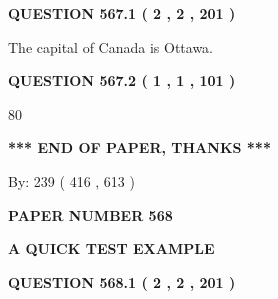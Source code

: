 \documentclass[12pt]{article}
\begin{document}
{\textbf{\Large{QUESTION
567.1 
 ( 2 , 2 , 201 )
}}}
  
  
 
 
\noindent{}
 
 
The capital of Canada is Ottawa.
 
 
 
 
  
\vspace{0.2in}
  
{\textbf{\Large{QUESTION
567.2 
 ( 1 , 1 , 101 )
}}}
  
  
 
 
\noindent{}

80
 
 
   
   
 \vspace{0.2in}
 
   
   
   
   
\vspace{1.0in} 
{\textbf{\large{ *** END OF PAPER, THANKS *** }}} 
   
   
\hspace{1.0in} By: 
 239 ( 416 ,  613 )
   
   
   
   
\newpage 
\setcounter{page}{ 
   568001 } 
   
   
   
   
 {\textbf{ \Large{ PAPER NUMBER  568  }}}
   
   
\vspace{0.2in}
   
   
   
   
   
   
 \vspace{0.2in}
{\LARGE {\textbf{ A QUICK TEST EXAMPLE}}}
   
   
  
\vspace{0.2in}
  
{\textbf{\Large{QUESTION
568.1 
 ( 2 , 2 , 201 )
}}}
  
  
 
 
\noindent{}
 
\end{document}
